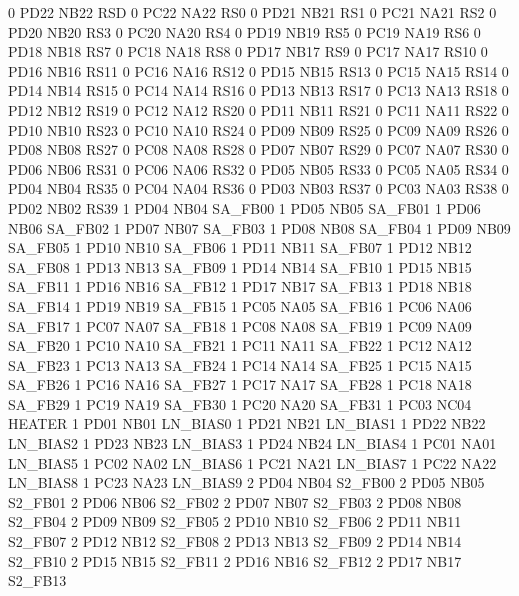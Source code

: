 0   PD22    NB22    RSD
0   PC22    NA22    RS0
0   PD21    NB21    RS1
0   PC21    NA21    RS2
0   PD20    NB20    RS3
0   PC20    NA20    RS4
0   PD19    NB19    RS5
0   PC19    NA19    RS6
0   PD18    NB18    RS7
0   PC18    NA18    RS8
0   PD17    NB17    RS9
0   PC17    NA17    RS10
0   PD16    NB16    RS11
0   PC16    NA16    RS12
0   PD15    NB15    RS13
0   PC15    NA15    RS14
0   PD14    NB14    RS15
0   PC14    NA14    RS16
0   PD13    NB13    RS17
0   PC13    NA13    RS18
0   PD12    NB12    RS19
0   PC12    NA12    RS20
0   PD11    NB11    RS21
0   PC11    NA11    RS22
0   PD10    NB10    RS23
0   PC10    NA10    RS24
0   PD09    NB09    RS25
0   PC09    NA09    RS26
0   PD08    NB08    RS27
0   PC08    NA08    RS28
0   PD07    NB07    RS29
0   PC07    NA07    RS30
0   PD06    NB06    RS31
0   PC06    NA06    RS32
0   PD05    NB05    RS33
0   PC05    NA05    RS34
0   PD04    NB04    RS35
0   PC04    NA04    RS36
0   PD03    NB03    RS37
0   PC03    NA03    RS38
0   PD02    NB02    RS39
1   PD04    NB04    SA_FB00
1   PD05    NB05    SA_FB01
1   PD06    NB06    SA_FB02
1   PD07    NB07    SA_FB03
1   PD08    NB08    SA_FB04
1   PD09    NB09    SA_FB05
1   PD10    NB10    SA_FB06
1   PD11    NB11    SA_FB07
1   PD12    NB12    SA_FB08
1   PD13    NB13    SA_FB09
1   PD14    NB14    SA_FB10
1   PD15    NB15    SA_FB11
1   PD16    NB16    SA_FB12
1   PD17    NB17    SA_FB13
1   PD18    NB18    SA_FB14
1   PD19    NB19    SA_FB15
1   PC05    NA05    SA_FB16
1   PC06    NA06    SA_FB17
1   PC07    NA07    SA_FB18
1   PC08    NA08    SA_FB19
1   PC09    NA09    SA_FB20
1   PC10    NA10    SA_FB21
1   PC11    NA11    SA_FB22
1   PC12    NA12    SA_FB23
1   PC13    NA13    SA_FB24
1   PC14    NA14    SA_FB25
1   PC15    NA15    SA_FB26
1   PC16    NA16    SA_FB27
1   PC17    NA17    SA_FB28
1   PC18    NA18    SA_FB29
1   PC19    NA19    SA_FB30
1   PC20    NA20    SA_FB31
1   PC03    NC04    HEATER
1   PD01    NB01    LN_BIAS0
1   PD21    NB21    LN_BIAS1
1   PD22    NB22    LN_BIAS2
1   PD23    NB23    LN_BIAS3
1   PD24    NB24    LN_BIAS4
1   PC01    NA01    LN_BIAS5
1   PC02    NA02    LN_BIAS6
1   PC21    NA21    LN_BIAS7
1   PC22    NA22    LN_BIAS8
1   PC23    NA23    LN_BIAS9
2   PD04    NB04    S2_FB00
2   PD05    NB05    S2_FB01
2   PD06    NB06    S2_FB02
2   PD07    NB07    S2_FB03
2   PD08    NB08    S2_FB04
2   PD09    NB09    S2_FB05
2   PD10    NB10    S2_FB06
2   PD11    NB11    S2_FB07
2   PD12    NB12    S2_FB08
2   PD13    NB13    S2_FB09
2   PD14    NB14    S2_FB10
2   PD15    NB15    S2_FB11
2   PD16    NB16    S2_FB12
2   PD17    NB17    S2_FB13
